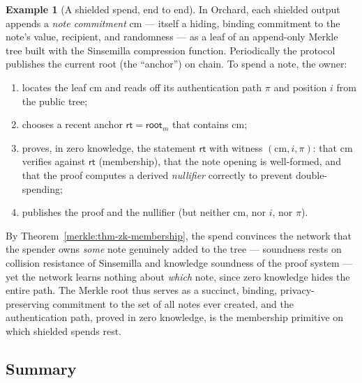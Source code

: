 \documentclass[11pt,a4paper]{article}
\theoremstyle{definition}
\newtheorem{example}[theorem]{Example}
\theoremstyle{remark}
\begin{document}
\begin{example}[A shielded spend, end to end]\label{merkle:exp-orchard}
In Orchard, each shielded output appends a \emph{note commitment} \(\mathrm{cm}\) --- itself a hiding, binding commitment to the note's value, recipient, and randomness --- as a leaf of an append-only Merkle tree built with the Sinsemilla compression function. Periodically the protocol publishes the current root (the ``anchor'') on chain. To spend a note, the owner:
\begin{enumerate}
\item locates the leaf \(\mathrm{cm}\) and reads off its authentication path \(\pi\) and position \(i\) from the public tree;
\item chooses a recent anchor \(\mathsf{rt} = \mathsf{root}_m\) that contains \(\mathrm{cm}\);
\item proves, in zero knowledge, the statement \(\mathsf{rt}\) with witness \((\mathrm{cm}, i, \pi)\): that \(\mathrm{cm}\) verifies against \(\mathsf{rt}\) (membership), that the note opening is well-formed, and that the proof computes a derived \emph{nullifier} correctly to prevent double-spending;
\item publishes the proof and the nullifier (but neither \(\mathrm{cm}\), nor \(i\), nor \(\pi\)).
\end{enumerate}
By Theorem~\ref{merkle:thm-zk-membership}, the spend convinces the network that the spender owns \emph{some} note genuinely added to the tree --- soundness rests on collision resistance of Sinsemilla and knowledge soundness of the proof system --- yet the network learns nothing about \emph{which} note, since zero knowledge hides the entire path. The Merkle root thus serves as a succinct, binding, privacy-preserving commitment to the set of all notes ever created, and the authentication path, proved in zero knowledge, is the membership primitive on which shielded spends rest.
\end{example}

\subsection{Summary}\label{merkle:sec-summary}
\end{document}
